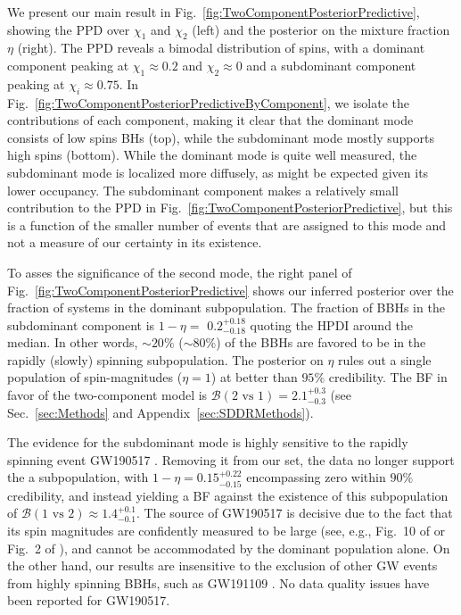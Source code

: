 \documentclass[twocolumn,usenames,dvipsnames,linenumbers]{aastex631}
\newcommand{\rapidspinfraction}{\ensuremath{0.2^{+0.18}_{-0.18}}\xspace}
\newcommand{\rapidspinfractionleaveoneout}{\ensuremath{0.15^{+0.22}_{-0.15}}\xspace}
\newcommand{\BFsecondcomponentexists}{2.1^{+0.3}_{-0.3}}
\newcommand{\BFleaveoneoutagainstsecondcomponentexists}{1.4^{+0.1}_{-0.1}}
\begin{document}
We present our main result in Fig.~\ref{fig:TwoComponentPosteriorPredictive}, showing the \ac{PPD} over $\chi_1$ and $\chi_2$ (left) and the posterior on the mixture fraction $\eta$ (right).
The \ac{PPD} reveals a bimodal distribution of spins, with a dominant component peaking at $\chi_1 \approx 0.2$ and $\chi_2 \approx 0$ and a subdominant component peaking at $\chi_i \approx 0.75$.
In Fig.~\ref{fig:TwoComponentPosteriorPredictiveByComponent}, we isolate the contributions of each component, making it clear that the dominant mode consists of low spins \acp{BH} (top), while the subdominant mode mostly supports high spins (bottom). While the dominant mode is quite well measured, the subdominant mode is localized more diffusely, as might be expected given its lower occupancy.
The subdominant component makes a relatively small contribution to the \ac{PPD} in Fig.~\ref{fig:TwoComponentPosteriorPredictive}, but this is a function of the smaller number of events that are assigned to this mode and not a measure of our certainty in its existence.

To asses the significance of the second mode, the right panel of Fig.~\ref{fig:TwoComponentPosteriorPredictive} shows our inferred posterior over the fraction of systems in the dominant subpopulation.
The fraction of \acp{BBH} in the subdominant component is $1-\eta=$ \rapidspinfraction quoting the \ac{HPDI} around the median. 
In other words, ${\sim}20\%$ (${\sim}80\%$) of the \acp{BBH} are favored to be in the rapidly (slowly) spinning subpopulation.
The posterior on $\eta$ rules out a single population of spin-magnitudes ($\eta = 1$) at better than $95\%$ credibility.
The \ac{BF} in favor of the two-component model is $\mathcal{B}(\text{2 vs 1}) = \BFsecondcomponentexists$ (see Sec.~\ref{sec:Methods} and Appendix~\ref{sec:SDDRMethods}).

The evidence for the subdominant mode is highly sensitive to the rapidly spinning event GW190517 \citep{LIGOScientific:2020ibl}.
Removing it from our set, the data no longer support the a subpopulation, with $1-\eta = \rapidspinfractionleaveoneout$ encompassing zero within $90\%$ credibility,
and instead yielding a \ac{BF} against the existence of this subpopulation of $\mathcal{B}(\text{1 vs 2}) \approx \BFleaveoneoutagainstsecondcomponentexists$. 
The source of GW190517 is decisive due to the fact that its spin magnitudes are confidently measured to be large (see, e.g., Fig.~10 of \citealt{LIGOScientific:2020ibl} or Fig.~2 of \citealt{Qin:2022ncz}), and cannot be accommodated by the dominant population alone.
On the other hand, our results are insensitive to the exclusion of other GW events from highly spinning \acp{BBH}, such as GW191109 \citep{KAGRA:2021vkt}.
No data quality issues have been reported for GW190517.
\end{document}
